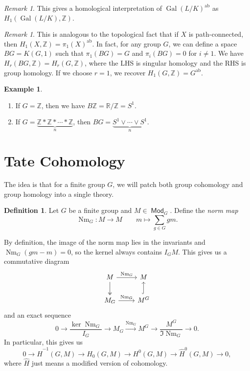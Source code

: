 \documentclass[leqno, openany]{memoir}
\theoremstyle{definition}
\newtheorem{defn}[thm]{Definition}
\newtheorem{exm}[thm]{Example}
\theoremstyle{remark}
\newtheorem{rmk}[thm]{Remark}
\theoremstyle{plain}
\theoremstyle{definition}
\theoremstyle{remark}
\newcommand{\R}{\mathbb{R}}
\newcommand{\Z}{\mathbb{Z}}
\newcommand{\mr}[1]{\mathrm{#1}}
\newcommand{\wh}[1]{\widehat{#1}}
\DeclareMathOperator{\Gal}{Gal}
\DeclareMathOperator{\Mod}{\mathsf{Mod}}
\DeclareMathOperator{\Nm}{Nm}
\begin{document}
\begin{rmk} This gives a homological interpretation of ${\Gal(L/K)}^{\mr{ab}}$
as $H_1(\Gal(L/K), \Z)$.  \end{rmk}

\begin{rmk} This is analogous to the topological fact that if $X$ is
    path-connected, then $H_1(X, \Z) = {\pi_1(X)}^{\mr{ab}}$. In fact, for any
    group $G$, we can define a space $BG = K(G, 1)$ such that $\pi_1(BG) = G$
    and $\pi_i(BG) = 0$ for $i \neq 1$. We have $H_r(BG, \Z) = H_r(G, \Z)$,
    where the LHS is singular homology and the RHS is group homology. If we
    choose $r = 1$, we recover $H_1(G, \Z) = G^{\mr{ab}}$.  \end{rmk}

\begin{exm}\leavevmode \begin{enumerate} \item If $G = \Z$, then we have $B\Z =
\R / \Z = S^1$.  \item If $G = \underbrace{\Z * \Z * \cdots * \Z}_n$, then $BG
= \underbrace{S^1 \vee \cdots \vee S^1}_n$.  \end{enumerate} \end{exm}

\section{Tate Cohomology}%

The idea is that for a finite group $G$, we will patch both group cohomology
and group homology into a single theory.

\begin{defn} Let $G$ be a finite group and $M \in \Mod_G$. Define the
    \textit{norm map} \[ \Nm_G \colon M \to M \qquad m \mapsto \sum_{g \in G}
    gm. \] \end{defn}

By definition, the image of the norm map lies in the invariants and $\Nm_G (gm
- m) = 0$, so the kernel always contains $I_G M$. This gives us a commutative
diagram \begin{equation*} \begin{tikzcd} M \ar{r}{\Nm_G}
    \ar[twoheadrightarrow]{d} & M \\ M_G \ar{r}{\Nm_G} & M^G
    \ar[hookrightarrow]{u} \end{tikzcd} \end{equation*} and an exact sequence
    \[ 0 \to \frac{\ker \Nm_G}{I_G} \to M_G \xrightarrow{\Nm_G} M^G \to
    \frac{M^G}{\Im \Nm_G} \to 0. \] In particular, this gives us \[ 0 \to
\wh{H}^{-1}(G, M) \to H_0(G, M) \to H^0(G, M) \to \wh{H}^0(G, M) \to 0, \]
where $\wh{H}$ just means a modified version of cohomology.
\end{document}

